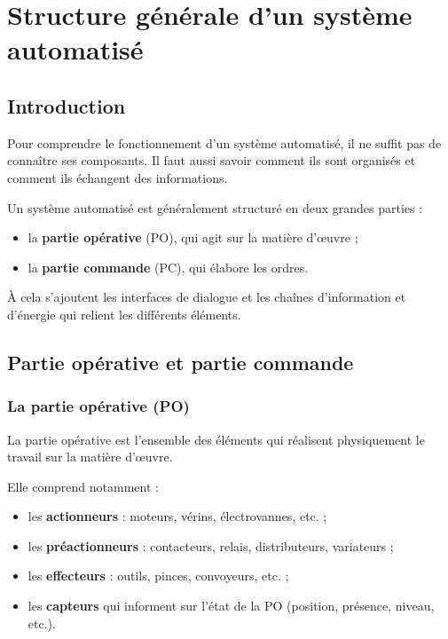 \section{Structure générale d'un système automatisé}

\subsection{Introduction}

Pour comprendre le fonctionnement d'un système automatisé, il ne suffit pas de connaître ses composants. Il faut aussi savoir comment ils sont organisés et comment ils échangent des informations.

Un système automatisé est généralement structuré en deux grandes parties :

\begin{itemize}
    \item la \textbf{partie opérative} (PO), qui agit sur la matière d'œuvre ;
    \item la \textbf{partie commande} (PC), qui élabore les ordres.
\end{itemize}

À cela s'ajoutent les interfaces de dialogue et les chaînes d'information et d'énergie qui relient les différents éléments.

\subsection{Partie opérative et partie commande}

\subsubsection{La partie opérative (PO)}

La partie opérative est l'ensemble des éléments qui réalisent physiquement le travail sur la matière d'œuvre.

Elle comprend notamment :

\begin{itemize}
    \item les \textbf{actionneurs} : moteurs, vérins, électrovannes, etc. ;
    \item les \textbf{préactionneurs} : contacteurs, relais, distributeurs, variateurs ;
    \item les \textbf{effecteurs} : outils, pinces, convoyeurs, etc. ;
    \item les \textbf{capteurs} qui informent sur l'état de la PO (position, présence, niveau, etc.).
\end{itemize}

